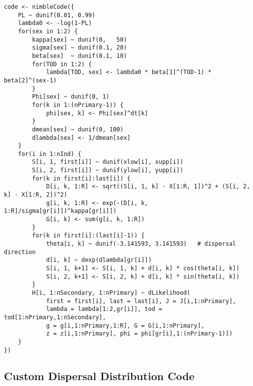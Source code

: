 \begin{singlespace}
\begin{small}
\begin{verbatim}
code <- nimbleCode({
    PL ~ dunif(0.01, 0.99)
    lambda0 <- -log(1-PL)
    for(sex in 1:2) {
        kappa[sex] ~ dunif(0,   50)
        sigma[sex] ~ dunif(0.1, 20)
        beta[sex]  ~ dunif(0.1, 10)
        for(TOD in 1:2) {
            lambda[TOD, sex] <- lambda0 * beta[1]^(TOD-1) * beta[2]^(sex-1)
        }
        Phi[sex] ~ dunif(0, 1)
        for(k in 1:(nPrimary-1)) {
            phi[sex, k] <- Phi[sex]^dt[k]
        }
        dmean[sex] ~ dunif(0, 100)
        dlambda[sex] <- 1/dmean[sex]
    }
    for(i in 1:nInd) {
        S[i, 1, first[i]] ~ dunif(xlow[i], xupp[i])
        S[i, 2, first[i]] ~ dunif(ylow[i], yupp[i])
        for(k in first[i]:last[i]) {
            D[i, k, 1:R] <- sqrt((S[i, 1, k] - X[1:R, 1])^2 + (S[i, 2, k] - X[1:R, 2])^2)
            g[i, k, 1:R] <- exp(-(D[i, k, 1:R]/sigma[gr[i]])^kappa[gr[i]])
            G[i, k] <- sum(g[i, k, 1:R])
        }
        for(k in first[i]:(last[i]-1)) {
            theta[i, k] ~ dunif(-3.141593, 3.141593)   # dispersal direction
            d[i, k] ~ dexp(dlambda[gr[i]])
            S[i, 1, k+1] <- S[i, 1, k] + d[i, k] * cos(theta[i, k])
            S[i, 2, k+1] <- S[i, 2, k] + d[i, k] * sin(theta[i, k])
        }
        H[i, 1:nSecondary, 1:nPrimary] ~ dLikelihood(
            first = first[i], last = last[i], J = J[i,1:nPrimary],
            lambda = lambda[1:2,gr[i]], tod = tod[1:nPrimary,1:nSecondary],
            g = g[i,1:nPrimary,1:R], G = G[i,1:nPrimary],
            z = z[i,1:nPrimary], phi = phi[gr[i],1:(nPrimary-1)])
    }
})
\end{verbatim}
\end{small}
\end{singlespace}







\newpage
\subsection{Custom Dispersal Distribution Code}

